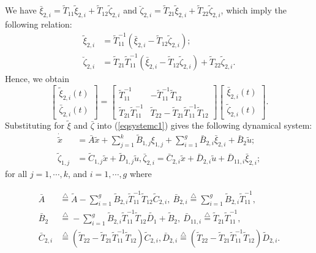 \documentclass[twocolumn]{autart}
\newcommand{\eqdef}{\stackrel{\triangle}{=}}
\begin{document}
We have $\bar{\xi}_{2,i}=\tilde{T}_{11}\tilde{\xi}_{2,i}+\tilde{T}_{12} \tilde{\zeta}_{2,i}$ and $\breve{\zeta}_{2,i}=\tilde{T}_{21}\tilde{\xi}_{2,i}+\tilde{T}_{22}\tilde{\zeta}_{2,i}$, which imply the following relation:
\begin{equation}
\label{eqnxizeta}
\begin{split}
\tilde{\xi}_{2,i}&=\tilde{T}_{11}^{-1}(\bar{\xi}_{2,i}-\tilde{T}_{12}\tilde{\zeta}_{2,i});\\  \breve{\zeta}_{2,i}&=\tilde{T}_{21}\tilde{T}_{11}^{-1}(\bar{\xi}_{2,i}-\tilde{T}_{12}\tilde{\zeta}_{2,i})+\tilde{T}_{22}\tilde{\zeta}_{2,i}.
\end{split}
\end{equation}
Hence, we obtain
\begin{equation}
\left[
\begin{array}{c}
\tilde{\xi}_{2,i}(t)\\
\bar{\zeta}_{2,i}(t)
\end{array}\right]=\left[
\begin{array}{cc}
\tilde{T}_{11}^{-1} & -\tilde{T}_{11}^{-1}\tilde{T}_{12}\\
\tilde{T}_{21}\tilde{T}_{11}^{-1} & \tilde{T}_{22}-\tilde{T}_{21}\tilde{T}_{11}^{-1}\tilde{T}_{12}
\end{array}\right] \left[
\begin{array}{c}
\bar{\xi}_{2,i}(t)\\
\tilde{\zeta}_{2,i}(t)
\end{array}\right].
\end{equation}
Substituting for $\tilde{\xi}$ and $\bar{\zeta}$ into (\ref{eqsystemc1}) gives the following dynamical system:
\begin{equation}
\label{eqC1system}
\begin{split}
\dot{\tilde{x}}&=\bar{A} \tilde{x}+ \sum_{j=1}^k \tilde{B}_{1,j} {\xi}_{1,j}+ \sum_{i=1}^g \bar{B}_{2,i} \bar{\xi}_{2,i}+\bar{B}_{2}\tilde{u} ;\\
\tilde{\zeta}_{1,j}&=\tilde{C}_{1,j}  \tilde{x}+\tilde{D}_{1,j} \tilde{u},\bar{\zeta}_{2,i}=\bar{C}_{2,i}  \tilde{x}+\bar{D}_{2,i} \tilde{u}+\bar{D}_{11,i} \bar{\xi}_{2,i};
\end{split}
\end{equation}
for all $j=1,\cdots, k$, and $i=1,\cdots,g$ where
\begin{small}
\begin{equation}
\label{eqdefAbar}
\begin{split}
\bar{A}&\eqdef \tilde{A}- \sum_{i=1}^g \tilde{B}_{2,i} \tilde{T}_{11}^{-1} \tilde{T}_{12} \tilde{C}_{2,i},~\bar{B}_{2,i}\eqdef \sum_{i=1}^g \tilde{B}_{2,i} \tilde{T}_{11}^{-1},\\
\bar{B}_2 &\eqdef -\sum_{i=1}^g \tilde{B}_{2,i} \tilde{T}_{11}^{-1} \tilde{T}_{12} \tilde{D_1}+\tilde{B}_2,~\bar{D}_{11,i}\eqdef \tilde{T}_{21} \tilde{T}_{11}^{-1},\\
\bar{C}_{2,i}& \eqdef (\tilde{T}_{22}-\tilde{T}_{21}\tilde{T}_{11}^{-1}\tilde{T}_{12})\tilde{C}_{2,i},\bar{D}_{2,i}\eqdef (\tilde{T}_{22}-\tilde{T}_{21}\tilde{T}_{11}^{-1}\tilde{T}_{12})\tilde{D}_{2,i}.
\end{split}
\end{equation}
\end{small}
\end{document}
